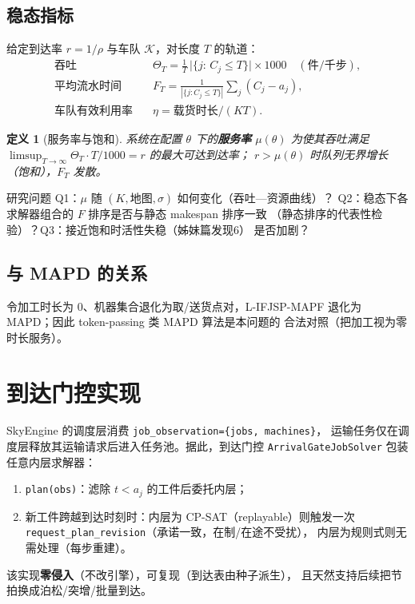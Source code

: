 \documentclass[UTF8,12pt,a4paper]{ctexart}
\newtheorem{definition}{定义}
\begin{document}
\subsection{稳态指标}
给定到达率 $r=1/\rho$ 与车队 $\mathcal{K}$，对长度 $T$ 的轨道：
\begin{align}
\text{吞吐} \quad & \Theta_T = \tfrac{1}{T}\,\bigl|\{j:\, C_j\le T\}\bigr|\times 1000
\quad(\text{件/千步}),\\
\text{平均流水时间} \quad & F_T = \tfrac{1}{|\{j: C_j\le T\}|}\sum_{j}(C_j - a_j),\\
\text{车队有效利用率} \quad & \eta = \text{载货时长}/(KT).
\end{align}
\begin{definition}[服务率与饱和]
系统在配置 $\theta$ 下的\textbf{服务率} $\mu(\theta)$ 为使其吞吐满足
$\limsup_{T\to\infty}\Theta_T\cdot T/1000 = r$ 的最大可达到达率；
$r>\mu(\theta)$ 时队列无界增长（饱和），$F_T$ 发散。
\end{definition}
研究问题 Q1：$\mu$ 随 $(K,\text{地图},\sigma)$ 如何变化（吞吐—资源曲线）？
Q2：稳态下各求解器组合的 $F$ 排序是否与静态 makespan 排序一致
（静态排序的代表性检验）？Q3：接近饱和时活性失稳（姊妹篇发现6）
是否加剧？

\subsection{与 MAPD 的关系}
令加工时长为 0、机器集合退化为取/送货点对，L-IFJSP-MAPF 退化为
MAPD\cite{ma2017mapd}；因此 token-passing 类 MAPD 算法是本问题的
合法对照（把加工视为零时长服务）。

\section{到达门控实现}\label{sec:gate}

SkyEngine 的调度层消费 \texttt{job\_observation=\{jobs, machines\}}，
运输任务仅在调度层释放其运输请求后进入任务池。据此，到达门控
\texttt{ArrivalGateJobSolver} 包装任意内层求解器：
\begin{enumerate}
  \item \texttt{plan(obs)}：滤除 $t<a_j$ 的工件后委托内层；
  \item 新工件跨越到达时刻时：内层为 CP-SAT（replayable）则触发一次
    \texttt{request\_plan\_revision}（承诺一致，在制/在途不受扰），
    内层为规则式则无需处理（每步重建）。
\end{enumerate}
该实现\textbf{零侵入}（不改引擎），可复现（到达表由种子派生），
且天然支持后续把节拍换成泊松/突增/批量到达。
\end{document}
